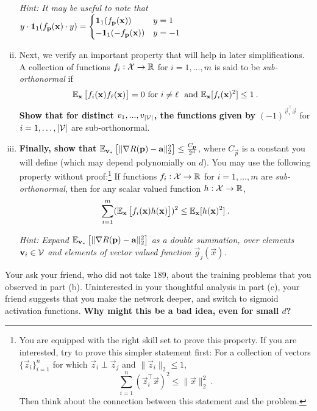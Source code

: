 \documentclass[preview]{standalone}
\begin{document}
\begin{Parts}
\begin{enumerate}[(i)]
\emph{Hint: It may be useful to note that $y\cdot\mathbf{1}_1(f_{\boldsymbol{\mathbf{p}}}(\boldsymbol{\mathbf{x}})\cdot y) = \begin{cases} \mathbf{1}_1(f_{\boldsymbol{\mathbf{p}}}(\boldsymbol{\mathbf{x}})) & y = 1\\ -\mathbf{1}_1(-f_{\boldsymbol{\mathbf{p}}}(\boldsymbol{\mathbf{x}})) & y = -1 \end{cases} $} 




\item 
Next, we verify an important property that will help in later simplifications. A collection of functions $f_i:\mathcal{X}\to\mathbb{R}$ for $i=1,\dots,m$ is said to be \emph{sub-orthonormal} if
\[\mathbb{E}_{\boldsymbol{\mathbf{x}}}\left[f_i(\boldsymbol{\mathbf{x}})f_\ell(\boldsymbol{\mathbf{x}})\right]=0~\text{for}~i\neq\ell~~\text{and}~\mathbb{E}_{\boldsymbol{\mathbf{x}}}[f_i(\boldsymbol{\mathbf{x}})^2]\leq1\:.\]
{\bf Show that for distinct $v_1, ..., v_{|\mathcal{V}|}$, the functions given by} $(-1)^{\vec v_i^\top \vec x}$ for $i=1,\dots,|\mathcal{V}|$ are sub-orthonormal.



\item {\bf Finally, show that} $\mathbb{E}_{\boldsymbol{\mathbf{v}}_*}\left[\|\nabla R(\boldsymbol{\mathbf{p}}) - \boldsymbol{\mathbf{a}}\|_2^2\right] \leq \frac{C_{\boldsymbol{\mathbf{p}}}}{2^d}$, where $C_{\vec p}$ is a constant you will define (which may depend polynomially on $d$). You may use the following property without proof:\footnote{
	You are equipped with the right skill set to prove this property.
	If you are interested, try to prove this simpler statement first: For a collection of vectors $\{\vec z_i\}_{i=1}^n$ for which $\vec z_i\perp\vec z_j$ and $\|\vec z_i\|_2\leq 1$,
	\[\sum_{i=1}^n (\vec z_i^\top \vec x)^2 
	\leq \|\vec x\|_2^2\:.\]
	Then think about the connection between this statement and the problem.
} If functions $f_i:\mathcal{X}\to\mathbb{R}$ for $i=1,\dots,m$ are \emph{sub-orthonormal}, then for any scalar valued function $h:\mathcal{X}\to\mathbb{R}$,
\[\sum_{i=1}^{m}(\mathbb{E}_{\boldsymbol{\mathbf{x}}}\left[f_i(\boldsymbol{\mathbf{x}})h(\boldsymbol{\mathbf{x}})\right])^{2} \leq \mathbb{E}_{\boldsymbol{\mathbf{x}}}[h(\boldsymbol{\mathbf{x}})^2]\:.\]

\emph{Hint: Expand $\mathbb{E}_{\boldsymbol{\mathbf{v}}_*}\left[\|\nabla R(\boldsymbol{\mathbf{p}}) - \boldsymbol{\mathbf{a}}\|_2^2\right]$ as a double summation, over elements $\boldsymbol{\mathbf{v}}_i\in\mathcal{V}$ and elements of vector valued function $\vec g_j(\vec x)$.}


\end{enumerate}

\Part Your ask your friend, who did not take 189, about the training problems that you observed in part (b). Uninterested in your thoughtful analysis in part (c), your friend suggests that you make the network deeper, and switch to sigmoid activation functions. {\bf Why might this be a bad idea, even for small $d$?} 



\end{Parts}
\end{document}
